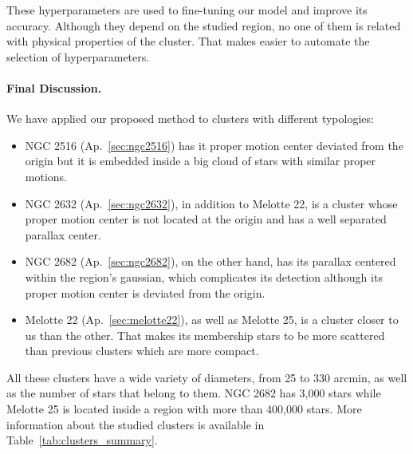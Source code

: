 \documentclass[11pt,a4paper,english,twocolumn]{article}
\begin{document}
These hyperparameters are used to fine-tuning our model and improve its accuracy. Although they depend on
the studied region, no one of them is related with physical properties of the cluster. That makes easier
to automate the selection of hyperparameters.

\paragraph{Final Discussion.}

We have applied our proposed method to clusters with different typologies:

\begin{itemize}
  \item NGC 2516 (Ap.~\ref{sec:ngc2516}) has it proper motion center deviated from the origin but
        it is embedded inside a big cloud of stars with similar proper motions.
  \item NGC 2632 (Ap.~\ref{sec:ngc2632}), in addition to Melotte 22, is a cluster whose proper motion center
        is not located at the origin and has a well separated parallax center.
  \item NGC 2682 (Ap.~\ref{sec:ngc2682}), on the other hand, has its parallax centered within the region's gaussian,
        which complicates its detection although its proper motion center is deviated from the origin.
  \item Melotte 22 (Ap.~\ref{sec:melotte22}), as well as Melotte 25, is a cluster closer to us than the other.
        That makes its membership stars to be more scattered than previous clusters which are more compact.
\end{itemize}

All these clusters have a wide variety of diameters, from 25 to 330 arcmin,
as well as the number of stars that belong to them. NGC 2682 has 3,000 stars
while Melotte 25 is located inside a region with more than 400,000 stars.
More information about the studied clusters is available in Table~\ref{tab:clusters_summary}.
\end{document}
